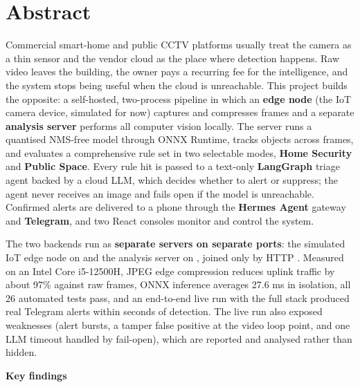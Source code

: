 \documentclass[11pt]{article}
\DeclareRobustCommand{\code}[1]{\texttt{\detokenize{#1}}}
\begin{document}
\tableofcontents
\clearpage
\listoffigures
\listoftables
\clearpage

\section*{Abstract}

Commercial smart-home and public CCTV platforms usually treat the camera as a thin sensor and the vendor cloud as the place where detection happens. Raw video leaves the building, the owner pays a recurring fee for the intelligence, and the system stops being useful when the cloud is unreachable. This project builds the opposite: a self-hosted, two-process pipeline in which an \textbf{edge node} (the IoT camera device, simulated for now) captures and compresses frames and a separate \textbf{analysis server} performs all computer vision locally. The server runs a quantised NMS-free \code{YOLO26n} model through ONNX Runtime, tracks objects across frames, and evaluates a comprehensive rule set in two selectable modes, \textbf{Home Security} and \textbf{Public Space}. Every rule hit is passed to a text-only \textbf{LangGraph} triage agent backed by a cloud LLM, which decides whether to alert or suppress; the agent never receives an image and fails open if the model is unreachable. Confirmed alerts are delivered to a phone through the \textbf{Hermes Agent} gateway and \textbf{Telegram}, and two React consoles monitor and control the system.

The two backends run as \textbf{separate servers on separate ports}: the simulated IoT edge node on \code{:8001} and the analysis server on \code{:8000}, joined only by HTTP \code{POST /frames}. Measured on an Intel Core i5-12500H, JPEG edge compression reduces uplink traffic by about 97\% against raw frames, ONNX inference averages 27.6 ms in isolation, all 26 automated tests pass, and an end-to-end live run with the full stack produced real Telegram alerts within seconds of detection. The live run also exposed weaknesses (alert bursts, a tamper false positive at the video loop point, and one LLM timeout handled by fail-open), which are reported and analysed rather than hidden.

\textbf{Key findings}
\end{document}
